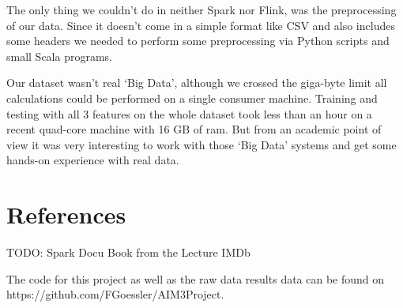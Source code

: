 \documentclass{vldb}
\begin{document}
\par The only thing we couldn't do in neither Spark nor Flink, was the preprocessing of our data. Since it doesn't come in a simple format like CSV and also includes some headers we needed to perform some preprocessing via Python scripts and small Scala programs. 
\par Our dataset wasn't real ‘Big Data’, although we crossed the giga-byte limit all calculations could be performed on a single consumer machine. Training and testing with all 3 features on the whole dataset took less than an hour on a recent quad-core machine with 16 GB of ram. But from an academic point of view it was very interesting to work with those ‘Big Data’ systems and get some hands-on experience with real data.

\section{References}

TODO:
Spark Docu
Book from the Lecture
IMDb

\bigskip
\par The code for this project as well as the raw data results data can be found on https://github.com/FGoessler/AIM3Project.
\end{document}
